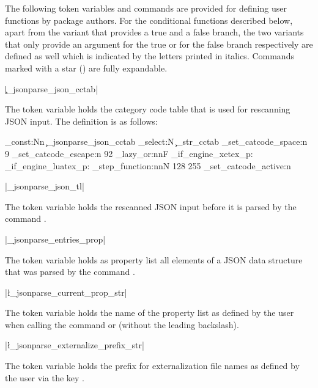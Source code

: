 \documentclass[a4paper]{article}
\begin{document}
{{The following token variables and commands are provided for defining user functions by package authors. For the conditional functions described below, apart from the variant that provides a true and a false branch, the two variants that only provide an argument for the true or for the false branch respectively are defined as well which is indicated by the letters {\itshape{}} printed in italics. Commands marked with a star (\expandablestar) are fully expandable.

\begin{macrodef}
|\c_jsonparse_json_cctab|
\end{macrodef}
The token variable  holds the category code table that is used for rescanning JSON input. The definition is as follows:

\begin{codeexample}
\cctab_const:Nn \c_jsonparse_json_cctab {
  \cctab_select:N \c_str_cctab
  \char_set_catcode_space:n { 9 }
  \char_set_catcode_escape:n { 92 }
  \bool_lazy_or:nnF {
    \sys_if_engine_xetex_p:
  } {
    \sys_if_engine_luatex_p:
  } {
    \int_step_function:nnN { 128 } { 255 }
      \char_set_catcode_active:n
  }
}
\end{codeexample}

\begin{macrodef}
|\g_jsonparse_json_tl|
\end{macrodef}
The token variable  holds the rescanned JSON input before it is parsed by the command .

\begin{macrodef}
|\g_jsonparse_entries_prop|
\end{macrodef}
The token variable  holds as property list all elements of a JSON data structure that was parsed by the command .

\begin{macrodef}
|\l_jsonparse_current_prop_str|
\end{macrodef}
The token variable  holds the name of the property list as defined by the user when calling the command \macro{\JSONParse} or \macro{\JSONParseFromFile} (without the leading backslash).

\begin{macrodef}
|\l_jsonparse_externalize_prefix_str|
\end{macrodef}
The token variable  holds the prefix for externalization file names as defined by the user via the key .

}}
\end{document}
